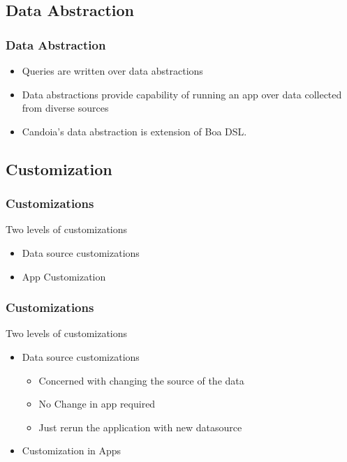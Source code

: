      \subsection{Data Abstraction}
        \begin{frame}
        \frametitle{Data Abstraction}
            \begin{itemize}
                \item Queries are written over data abstractions
               \item Data abstractions provide capability of running an app over data collected
               from diverse sources
               \item Candoia's data abstraction is extension of Boa DSL.
            \end{itemize}
        \end{frame}


    \subsection{Customization}
        \begin{frame}
        \frametitle{Customizations}
            Two levels of customizations
            \begin{itemize}
                \item Data source customizations
                \item App Customization
            \end{itemize}
        \end{frame}

        \begin{frame}
        \frametitle{Customizations}
            Two levels of customizations
            \begin{itemize}
                \item Data source customizations
                    \begin{itemize}
                        \item Concerned with changing the source of the data
                        \item No Change in app required
                        \item Just rerun the application with new datasource
                    \end{itemize}
                \item Customization in Apps
            \end{itemize}
        \end{frame}

